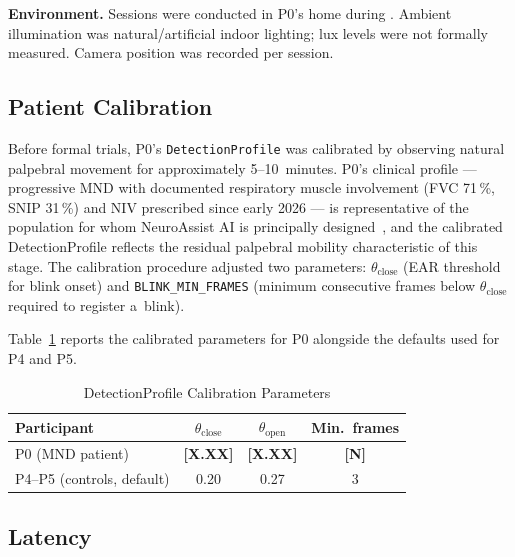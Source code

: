 \textbf{Environment.} Sessions were conducted in P0's home during
. Ambient illumination was natural/artificial
indoor lighting; lux levels were not formally measured. Camera position was recorded
per session.

\subsection{Patient Calibration}
\label{sec:calibration}

Before formal trials, P0's \texttt{DetectionProfile} was calibrated by observing
natural palpebral movement for approximately 5--10~minutes. P0's clinical profile — progressive MND with documented respiratory muscle involvement (FVC 71\,\%, SNIP 31\,\%) and NIV prescribed since early 2026 — is representative of the population for whom NeuroAssist AI is principally designed~\cite{berlowitz2021niv, yang2026pva}, and the calibrated DetectionProfile reflects the residual palpebral mobility characteristic of this stage. The calibration procedure adjusted two parameters: $\theta_\text{close}$ (EAR threshold for
blink onset) and \texttt{BLINK\_MIN\_FRAMES} (minimum consecutive frames below
$\theta_\text{close}$ required to register a~blink).

Table~\ref{tab:calibration} reports the calibrated parameters for P0 alongside
the defaults used for P4 and P5.

\begin{table}[!t]
  \renewcommand{\arraystretch}{1.15}
  \caption{DetectionProfile Calibration Parameters}
  \label{tab:calibration}
  \centering
  \begin{tabular}{lccc}
    \toprule
    Participant & $\theta_\text{close}$ & $\theta_\text{open}$ & Min.\ frames \\
    \midrule
    P0 (MND patient) & \textbf{[X.XX]} & \textbf{[X.XX]} & \textbf{[N]} \\
    P4--P5 (controls, default) & 0.20 & 0.27 & 3 \\
    \bottomrule
  \end{tabular}
\end{table}

\subsection{Latency}
\label{sec:latency}

